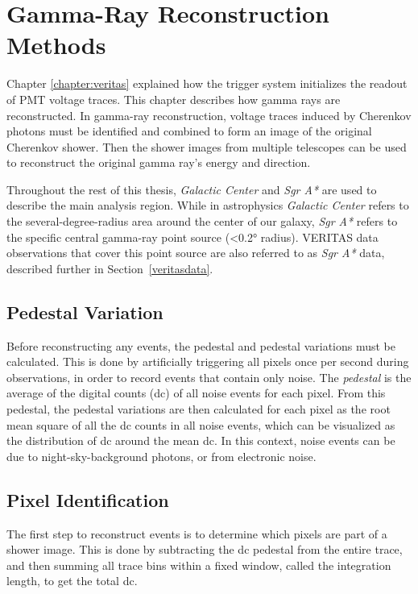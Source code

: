 \cleartooddpage[\thispagestyle{empty}]
\newcommand{\ETrue}{$\textrm{E}_{\textrm{True}}$}

\chapter{Gamma-Ray Reconstruction Methods}\label{ch:grrecon}

Chapter \ref{chapter:veritas} explained how the trigger system initializes the readout of PMT voltage traces.
This chapter describes how gamma rays are reconstructed.
In gamma-ray reconstruction, voltage traces induced by Cherenkov photons must be identified and combined to form an image of the original Cherenkov shower.
Then the shower images from multiple telescopes can be used to reconstruct the original gamma ray's energy and direction.

Throughout the rest of this thesis, \textit{Galactic Center} and \textit{Sgr A*} are used to describe the main analysis region.
While in astrophysics \textit{Galactic Center} refers to the several-degree-radius area around the center of our galaxy, \textit{Sgr A*} refers to the specific central gamma-ray point source (<\ang{0.2} radius).
VERITAS data observations that cover this point source are also referred to as \textit{Sgr A*} data, described further in Section~\ref{veritasdata}.


\section{Pedestal Variation}
Before reconstructing any events, the pedestal and pedestal variations must be calculated.
This is done by artificially triggering all pixels once per second during observations, in order to record events that contain only noise.
The \textit{pedestal} is the average of the digital counts (dc) of all noise events for each pixel.
From this pedestal, the pedestal variations are then calculated for each pixel as the root mean square of all the dc counts in all noise events, which can be visualized as the distribution of dc around the mean dc.
In this context, noise events can be due to night-sky-background photons, or from electronic noise.

\section{Pixel Identification}
The first step to reconstruct events is to determine which pixels are part of a shower image.
This is done by subtracting the dc pedestal from the entire trace, and then summing all trace bins within a fixed window, called the integration length, to get the total dc.

